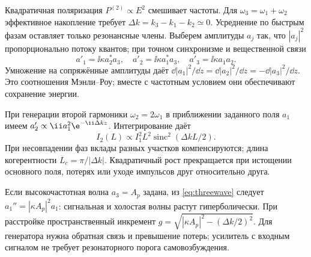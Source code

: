
Квадратичная поляризация $P^{(2)}\propto E^2$ смешивает частоты. Для $\omega_3=\omega_1+\omega_2$ эффективное накопление требует $\Delta k=k_3-k_1-k_2\simeq0$. Усреднение по быстрым фазам оставляет только резонансные члены. Выберем амплитуды $a_j$ так, что $|a_j|^2$ пропорционально потоку квантов; при точном синхронизме и вещественной связи
\begin{equation}\label{eq:threewave}
 a'_1=\ii\kappa a_2^*a_3,\quad
 a'_2=\ii\kappa a_1^*a_3,\quad
 a'_3=\ii\kappa a_1a_2.
\end{equation}
Умножение на сопряжённые амплитуды даёт $\dd|a_1|^2/\dd z=\dd|a_2|^2/\dd z=-\dd|a_3|^2/\dd z$. Это соотношения Мэнли–Роу; вместе с частотным условием они обеспечивают сохранение энергии.

При генерации второй гармоники $\omega_2=2\omega_1$ в приближении заданного поля $a_1$ имеем $a_2'\propto\ii a_1^2\e^{-\ii\Delta kz}$. Интегрирование даёт
\begin{equation}
 I_2(L)\propto I_1^2 L^2\operatorname{sinc}^2(\Delta kL/2).
\end{equation}
При несовпадении фаз вклады разных участков компенсируются; длина когерентности $L_c=\pi/|\Delta k|$. Квадратичный рост прекращается при истощении основного поля, потерях или уходе импульсов друг относительно друга.

Если высокочастотная волна $a_3=A_p$ задана, из \eqref{eq:threewave} следует $a_1''=|\kappa A_p|^2a_1$: сигнальная и холостая волны растут гиперболически. При расстройке пространственный инкремент $g=\sqrt{|\kappa A_p|^2-(\Delta k/2)^2}$. Для генератора нужна обратная связь и превышение потерь; усилитель с входным сигналом не требует резонаторного порога самовозбуждения.
